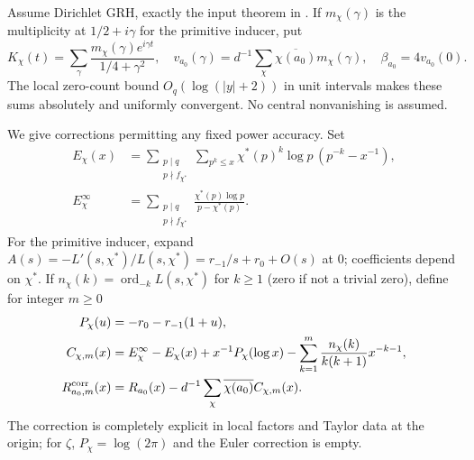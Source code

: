 \documentclass[11pt,letterpaper]{article}
\theoremstyle{remark}\newtheorem{remark}[theorem]{Remark}
\newcommand{\ord}{\operatorname{ord}}\newcommand{\supp}{\operatorname{supp}}
\begin{document}
Assume Dirichlet GRH, exactly the input theorem in \cite{Sernau,ProveIt}. If $m_\chi(\gamma)$ is the multiplicity at $1/2+i\gamma$ for the primitive inducer, put
\[
 K_\chi(t)=\sum_\gamma \frac{m_\chi(\gamma)e^{i\gamma t}}{1/4+\gamma^2},\quad
 v_{a_0}(\gamma)=d^{-1}\sum_\chi\overline{\chi(a_0)}m_\chi(\gamma),\quad
 \beta_{a_0}=4v_{a_0}(0).
\]
The local zero-count bound $O_q(\log(|y|+2))$ in unit intervals makes these sums absolutely and uniformly convergent. No central nonvanishing is assumed.

We give corrections permitting any fixed power accuracy. Set
\begin{align*}
 E_\chi(x)&=\sum_{\substack{p\mid q\\p\nmid f_{\chi^*}}}\sum_{p^k\le x}
  \chi^*(p)^k\log p\,(p^{-k}-x^{-1}),\\
 E_\chi^\infty&=\sum_{\substack{p\mid q\\p\nmid f_{\chi^*}}}
 \frac{\chi^*(p)\log p}{p-\chi^*(p)}.
\end{align*}
For the primitive inducer, expand $A(s)=-L'(s,\chi^*)/L(s,\chi^*)=r_{-1}/s+r_0+O(s)$ at $0$; coefficients depend on $\chi^*$. If $n_\chi(k)=\ord_{-k}L(s,\chi^*)$ for $k\ge1$ (zero if not a trivial zero), define for integer $m\ge0$
\begin{align}
 P_\chi(u)&=-r_0-r_{-1}(1+u),\notag\\
 C_{\chi,m}(x)&=E_\chi^\infty-E_\chi(x)+x^{-1}P_\chi(\log x)
  -\sum_{k=1}^{m}\frac{n_\chi(k)}{k(k+1)}x^{-k-1},\label{eq:correct}\\
 R^{\mathrm{corr}}_{a_0,m}(x)&=R_{a_0}(x)-d^{-1}\sum_\chi\overline{\chi(a_0)}C_{\chi,m}(x).\notag
\end{align}
The correction is completely explicit in local factors and Taylor data at the origin; for $\zeta$, $P_\chi=\log(2\pi)$ and the Euler correction is empty.
\end{document}
